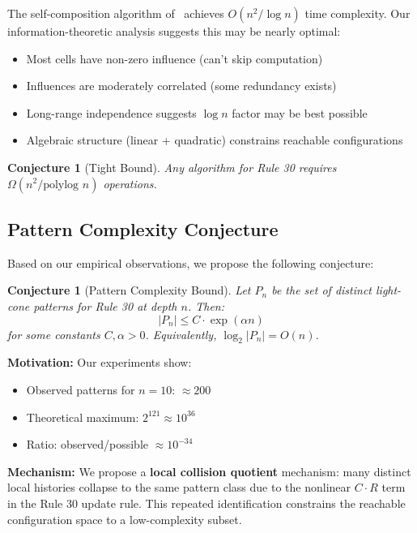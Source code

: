 \documentclass[11pt]{article}
\newtheorem{conjecture}[theorem]{Conjecture}
\begin{document}
The self-composition algorithm of~\citet{natal_2024} achieves $O(n^2 / \log n)$ time complexity. Our information-theoretic analysis suggests this may be nearly optimal:
\begin{itemize}
    \item Most cells have non-zero influence (can't skip computation)
    \item Influences are moderately correlated (some redundancy exists)
    \item Long-range independence suggests $\log n$ factor may be best possible
    \item Algebraic structure (linear + quadratic) constrains reachable configurations
\end{itemize}

\begin{conjecture}[Tight Bound]
Any algorithm for Rule 30 requires $\Omega(n^2 / \text{polylog } n)$ operations.
\end{conjecture}

\subsection{Pattern Complexity Conjecture}

Based on our empirical observations, we propose the following conjecture:

\begin{conjecture}[Pattern Complexity Bound]
Let $P_n$ be the set of distinct light-cone patterns for Rule 30 at depth $n$. Then:
$$|P_n| \leq C \cdot \exp(\alpha n)$$
for some constants $C, \alpha > 0$. Equivalently, $\log_2 |P_n| = O(n)$.
\end{conjecture}

\textbf{Motivation:} Our experiments show:
\begin{itemize}
    \item Observed patterns for $n=10$: $\approx 200$
    \item Theoretical maximum: $2^{121} \approx 10^{36}$
    \item Ratio: observed/possible $\approx 10^{-34}$
\end{itemize}

\textbf{Mechanism:} We propose a \textbf{local collision quotient} mechanism: many distinct local histories collapse to the same pattern class due to the nonlinear $C \cdot R$ term in the Rule 30 update rule. This repeated identification constrains the reachable configuration space to a low-complexity subset.
\end{document}
